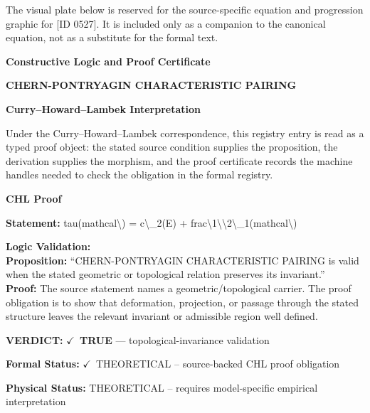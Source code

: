 \begingroup\footnotesize\sloppy
The visual plate below is reserved for the source-specific equation and progression graphic for [ID 0527]. It is included only as a companion to the canonical equation, not as a substitute for the formal text.
\par\endgroup
\ifTZPDarkEdition
{}
\fi

\clearpage
\begingroup\tzpsupportsetup
\noindent\textbf{\fontsize{10.8pt}{12.8pt}\selectfont [ID 0527] Constructive Logic and Proof Certificate}\par
\noindent\textbf{\fontsize{10pt}{12pt}\selectfont CHERN-PONTRYAGIN CHARACTERISTIC PAIRING}\par
\vspace{0.45em}
\begingroup
\footnotesize
\setlength{\parskip}{0.22em}
\setlength{\parindent}{0pt}
\noindent\textbf{Curry--Howard--Lambek Interpretation}\par
Under the Curry--Howard--Lambek correspondence, this registry entry is read as a typed proof
object: the stated source condition supplies the proposition, the derivation supplies the
morphism, and the proof certificate records the machine handles needed to check the obligation
in the formal registry.

\vspace{0.45em}
\noindent\textbf{CHL Proof}\par
\textbf{Statement:} tau(mathcal\textbackslash{}) = c\textbackslash{}\_2(E) + frac\textbackslash{}1\textbackslash{}\textbackslash{}2\textbackslash{}\_1(mathcal\textbackslash{})

\textbf{Logic Validation:}\\
\textbf{Proposition:} ``CHERN-PONTRYAGIN CHARACTERISTIC PAIRING is valid when the stated geometric or
topological relation preserves its invariant.''\\
\textbf{Proof:} The source statement names a geometric/topological carrier. The proof obligation is to
show that deformation, projection, or passage through the stated structure leaves the
relevant invariant or admissible region well defined.

\textbf{VERDICT:} \ensuremath{\checkmark}\ \textbf{TRUE} --- topological-invariance validation

\textbf{Formal Status:} \ensuremath{\checkmark}\ THEORETICAL -- source-backed CHL proof obligation

\textbf{Physical Status:} THEORETICAL -- requires model-specific empirical interpretation
\par\vspace{0.45em}
\par
\ifTZPDarkEdition
{}
\fi
\endgroup
\endgroup
